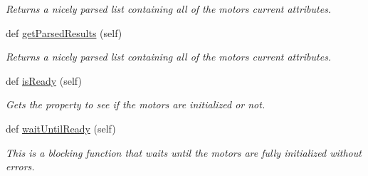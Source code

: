 \begin{DoxyCompactItemize}
\begin{DoxyCompactList}\small\item\em Returns a nicely parsed list containing all of the motor\textquotesingle{}s current attributes. \end{DoxyCompactList}\item 
def \hyperlink{classMoteus_1_1Moteus_aa2ab74638356c8b9edb5ecf959c30645}{get\+Parsed\+Results} (self)
\begin{DoxyCompactList}\small\item\em Returns a nicely parsed list containing all of the motor\textquotesingle{}s current attributes. \end{DoxyCompactList}\item 
def \hyperlink{classMoteus_1_1Moteus_a2e1ae006212c2b107a6b63478b1137cb}{is\+Ready} (self)
\begin{DoxyCompactList}\small\item\em Gets the property to see if the motors are initialized or not. \end{DoxyCompactList}\item 
def \hyperlink{classMoteus_1_1Moteus_a363a7881500b2ca7efccc6dfd64dca42}{wait\+Until\+Ready} (self)
\begin{DoxyCompactList}\small\item\em This is a blocking function that waits until the motors are fully initialized without errors. \end{DoxyCompactList}\end{DoxyCompactItemize}

